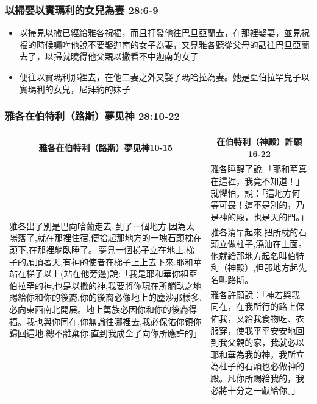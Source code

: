 \subsubsection{以掃娶以實瑪利的女兒為妻 28:6-9}
\label{sec:YiSaiQuYiShiMaLiNuEr}
\begin{itemize} 
\itemsep-.35em 
\item 以掃見以撒已經給雅各祝福，而且打發他往巴旦亞蘭去，在那裡娶妻，並見祝福的時候囑咐他說不要娶迦南的女子為妻，又見雅各聽從父母的話往巴旦亞蘭去了，以掃就曉得他父親以撒看不中迦南的女子
\item 便往以實瑪利那裡去，在他二妻之外又娶了瑪哈拉為妻。她是亞伯拉罕兒子以實瑪利的女兒，尼拜約的妹子
\end{itemize} 
\fi

\subsubsection{雅各在伯特利（路斯）夢见神 28:10-22}
\label{sec:YaGeMengJianShen}

\noindent 
\begin{table}[H]
\centering
\begin{tabular}{p{8.75cm}|p{}}\hline\hline
\multicolumn{1}{c|}{雅各在伯特利（路斯）夢见神10-15}&\multicolumn{1}{c}{在伯特利（神殿）許願16-22}\\\hline
\multirow{3}{9cm}{雅各出了別是巴向哈蘭走去. 到了一個地方,因為太陽落了,就在那裡住宿,便拾起那地方的一塊石頭枕在頭下,在那裡躺臥睡了。 夢見一個梯子立在地上,梯子的頭頂著天,有神的使者在梯子上上去下來.耶和華站在梯子以上(站在他旁邊)說:「我是耶和華你祖亞伯拉罕的神,也是以撒的神,我要將你現在所躺臥之地賜給你和你的後裔.你的後裔必像地上的塵沙那樣多,必向東西南北開展。地上萬族必因你和你的後裔得福。我也與你同在,你無論往哪裡去,我必保佑你領你歸回這地,總不離棄你,直到我成全了向你所應許的」} 
&雅各睡醒了說:「耶和華真在這裡，我竟不知道！」就懼怕，說：「這地方何等可畏！這不是別的，乃是神的殿，也是天的門。」\\\cline{2-2}
&雅各清早起來,把所枕的石頭立做柱子,澆油在上面。他就給那地方起名叫伯特利（神殿）,但那地方起先名叫路斯。\\\cline{2-2}
&雅各許願說：「神若與我同在，在我所行的路上保佑我，又給我食物吃、衣服穿，使我平平安安地回到我父親的家，我就必以耶和華為我的神，我所立為柱子的石頭也必做神的殿。凡你所賜給我的，我必將十分之一獻給你。」\\\hline
\end{tabular}
\end{table}



